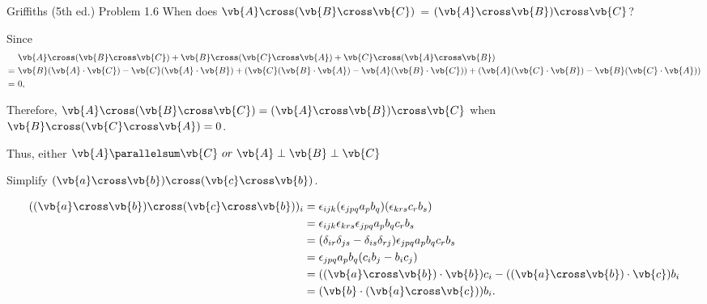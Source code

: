 \documentclass[a4paper,12pt]{report}
\begin{document}
\example
{Griffiths (5th ed.) Problem 1.6}
{When does \(\vb{A} \cross (\vb{B} \cross \vb{C})\) = \((\vb{A} \cross \vb{B}) \cross \vb{C}\)?}
{Since
\begin{equation}
	\begin{aligned}
		&\vb{A} \cross (\vb{B} \cross \vb{C}) + \vb{B} \cross (\vb{C} \cross \vb{A}) + \vb{C} \cross (\vb{A} \cross \vb{B}) \\
		= ~&\vb{B}(\vb{A} \cdot \vb{C}) - \vb{C}(\vb{A} \cdot \vb{B}) + (\vb{C}(\vb{B} \cdot \vb{A}) - \vb{A}(\vb{B} \cdot \vb{C})) + (\vb{A}(\vb{C} \cdot \vb{B}) - \vb{B}(\vb{C} \cdot \vb{A})) \\
		= ~&0,
	\end{aligned}
\end{equation}

Therefore, \(\vb{A} \cross (\vb{B} \cross \vb{C}) = (\vb{A} \cross \vb{B}) \cross \vb{C}\) when \(\vb{B} \cross (\vb{C} \cross \vb{A}) = 0\).

Thus, either \(\vb{A} \parallelsum \vb{C} ~ or ~ \vb{A} \perp \vb{B} \perp \vb{C}\)}

{Simplify \((\vb{a} \cross \vb{b} )\cross (\vb{c} \cross \vb{b} )\). }
{\begin{equation}
    \begin{aligned}
        ((\vb{a} \cross \vb{b} )\cross (\vb{c} \cross \vb{b} ))_{i}  &= \epsilon _{ijk} (\epsilon _{jpq} a_{p} b_{q} )(\epsilon _{krs} c_{r} b_{s} ) \\
        &= \epsilon _{ijk} \epsilon _{krs} \epsilon _{jpq} a_{p} b_{q} c_{r} b_{s} \\
        &= (\delta _{ir} \delta _{js} -\delta _{is} \delta _{rj} ) \epsilon _{jpq} a_{p} b_{q} c_{r} b_{s} \\
        &= \epsilon _{jpq} a_{p} b_{q} (c_{i} b_{j} -b_{i} c_{j} ) \\
        &= ((\vb{a} \cross \vb{b} )\cdot \vb{b} )c_{i} - ((\vb{a} \cross \vb{b} )\cdot \vb{c} )b_{i} \\
        &= (\vb{b} \cdot (\vb{a} \cross \vb{c} ))b_{i}.  
    \end{aligned}
\end{equation}

} 
\end{document}

